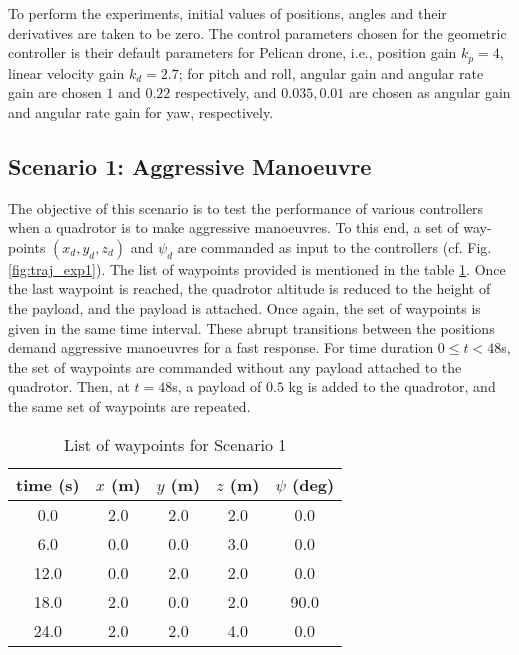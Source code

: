 To perform the experiments, initial values of positions, angles and their derivatives are taken to be zero. The control parameters chosen for the geometric controller is their default parameters for Pelican drone, i.e., position gain $k_p = 4$, linear velocity gain $k_d = 2.7$; for pitch and roll, angular gain and angular rate gain are chosen $1$ and  $0.22$  respectively, and $0.035, 0.01$ are chosen as angular gain and angular rate gain for yaw, respectively. 

\subsection{Scenario 1: Aggressive Manoeuvre}
The objective of this scenario is to test the performance of various controllers when a quadrotor is to make aggressive manoeuvres. To this end, a set of way-points $(x_d, y_d, z_d)$ and $ \psi_d$ are commanded as input to the controllers (cf. Fig. \ref{fig:traj_exp1}). The list of waypoints provided is mentioned in the table \ref{tab:waypoints}. Once the last waypoint is reached, the quadrotor altitude is reduced to the height of the payload, and the payload is attached. Once again, the set of waypoints is given in the same time interval. These abrupt transitions between the positions demand aggressive manoeuvres for a fast response. For time duration $0\leq t<48$s, the set of waypoints are commanded without any payload attached to the quadrotor. Then, at $t=48$s, a payload of $0.5$ kg is added to the quadrotor, and the same set of waypoints are repeated.

\begin{table}[h!]
\renewcommand{\arraystretch}{1.1}
\caption{{List of waypoints for Scenario 1}}
\label{tab:waypoints}
		\centering
{
{	\begin{tabular}{c c c c c}
		\hline
		\hline
		
		 time (s) & $x$ (m) & $y$ (m) & $z$ (m)  & $\psi$ (deg) \\
		 \hline
		0.0 & 2.0 & 2.0  & 2.0 & 0.0 \\
		\hline
		6.0 & 0.0 & 0.0 & 3.0 & 0.0 \\
		\hline
		12.0 & 0.0 & 2.0 & 2.0 & 0.0 \\
		\hline
		18.0 & 2.0 & 0.0 & 2.0 & 90.0 \\
		\hline
		24.0 & 2.0 & 2.0 & 4.0 & 0.0 \\
		\hline
		\hline
\end{tabular}}}
\end{table}

